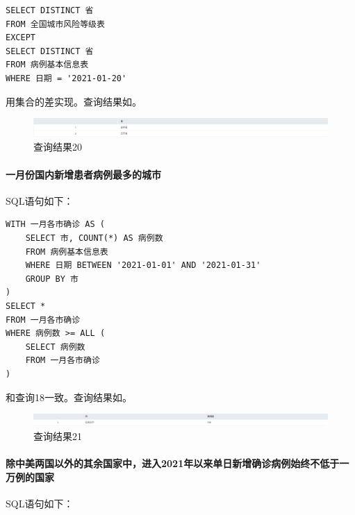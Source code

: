 \documentclass[lang=cn,11pt,a4paper,cite=authornum]{paper}
\begin{document}
\begin{code}
\begin{verbatim}
SELECT DISTINCT 省
FROM 全国城市风险等级表
EXCEPT 
SELECT DISTINCT 省
FROM 病例基本信息表
WHERE 日期 = '2021-01-20'
\end{verbatim}
\end{code}

用集合的差实现。查询结果如。

\begin{figure}[!htb]
    \centering
    \includegraphics[width=\textwidth]{./images/lab1_query20.png}
    \caption{查询结果20\label{fig:query20}}
\end{figure}

\paragraph{一月份国内新增患者病例最多的城市} SQL语句如下：

\begin{code}
\begin{verbatim}
WITH 一月各市确诊 AS (
    SELECT 市, COUNT(*) AS 病例数
    FROM 病例基本信息表
    WHERE 日期 BETWEEN '2021-01-01' AND '2021-01-31'
    GROUP BY 市
)
SELECT *
FROM 一月各市确诊
WHERE 病例数 >= ALL (
    SELECT 病例数
    FROM 一月各市确诊
)
\end{verbatim}
\end{code}

和查询18一致。查询结果如。

\begin{figure}[!htb]
    \centering
    \includegraphics[width=\textwidth]{./images/lab1_query21.png}
    \caption{查询结果21\label{fig:query21}}
\end{figure}

\paragraph{除中美两国以外的其余国家中，进入2021年以来单日新增确诊病例始终不低于一万例的国家} SQL语句如下：
\end{document}
